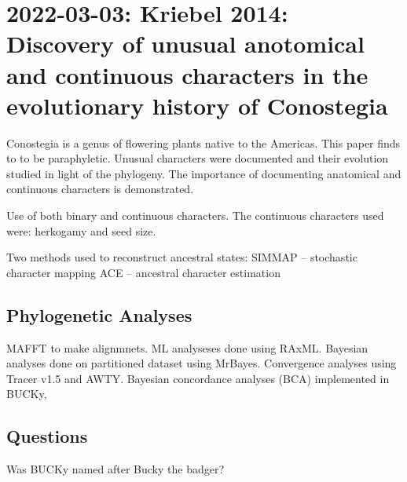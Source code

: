\documentclass{article}
\begin{document}
\section{2022-03-03: Kriebel 2014: Discovery of unusual anotomical and
  continuous characters in the evolutionary history of Conostegia}

Conostegia is a genus of flowering plants native to the Americas. This paper
finds to to be paraphyletic. Unusual characters were documented and their
evolution studied in light of the phylogeny. The importance of documenting
anatomical and continuous characters is demonstrated.

Use of both binary and continuous characters. The continuous characters used were: herkogamy and seed size.

Two methods used to reconstruct ancestral states:
SIMMAP -- stochastic character mapping
ACE -- ancestral character estimation

\subsection{Phylogenetic Analyses}
MAFFT to make alignmnets. ML analyseses done using RAxML. Bayesian analyses done
on partitioned dataset using MrBayes. Convergence analyses using Tracer v1.5 and
AWTY. Bayesian concordance analyses (BCA) implemented in BUCKy,




\subsection{Questions}

Was BUCKy named after Bucky the badger?
\end{document}

